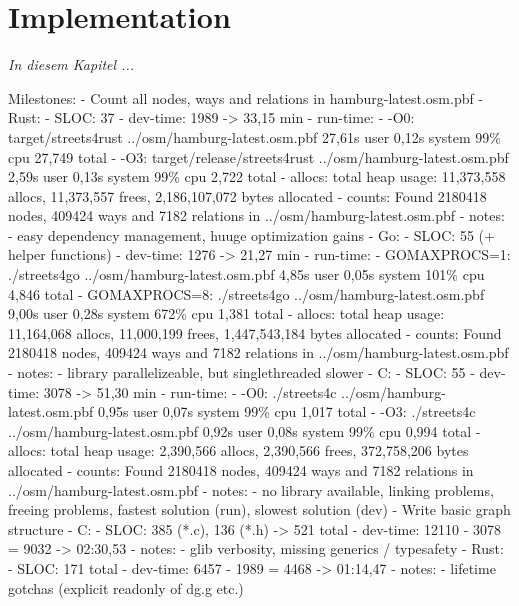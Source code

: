 \chapter{Implementation}
\label{chap:Implementation}

\textit{%
In diesem Kapitel ...
}
\bigskip


Milestones:
    - Count all nodes, ways and relations in hamburg-latest.osm.pbf
        - Rust:
            - SLOC: 37
            - dev-time: 1989 -> 33,15 min
            - run-time:
                - -O0: target/streets4rust ../osm/hamburg-latest.osm.pbf  27,61s user 0,12s system 99\% cpu 27,749 total
                - -O3: target/release/streets4rust ../osm/hamburg-latest.osm.pbf  2,59s user 0,13s system 99\% cpu 2,722 total
            - allocs: total heap usage: 11,373,558 allocs, 11,373,557 frees, 2,186,107,072 bytes allocated
            - counts: Found 2180418 nodes, 409424 ways and 7182 relations in ../osm/hamburg-latest.osm.pbf
            - notes:
                - easy dependency management, huuge optimization gains
        - Go:
            - SLOC: 55 (+ helper functions)
            - dev-time: 1276 -> 21,27 min
            - run-time:
                - GOMAXPROCS=1: ./streets4go ../osm/hamburg-latest.osm.pbf  4,85s user 0,05s system 101\% cpu 4,846 total
                - GOMAXPROCS=8: ./streets4go ../osm/hamburg-latest.osm.pbf  9,00s user 0,28s system 672\% cpu 1,381 total
            - allocs: total heap usage: 11,164,068 allocs, 11,000,199 frees, 1,447,543,184 bytes allocated
            - counts: Found 2180418 nodes, 409424 ways and 7182 relations in ../osm/hamburg-latest.osm.pbf
            - notes:
                - library parallelizeable, but singlethreaded slower
        - C:
            - SLOC: 55
            - dev-time: 3078 -> 51,30 min
            - run-time:
                - -O0: ./streets4c ../osm/hamburg-latest.osm.pbf  0,95s user 0,07s system 99\% cpu 1,017 total
                - -O3: ./streets4c ../osm/hamburg-latest.osm.pbf  0,92s user 0,08s system 99\% cpu 0,994 total
            - allocs: total heap usage: 2,390,566 allocs, 2,390,566 frees, 372,758,206 bytes allocated
            - counts: Found 2180418 nodes, 409424 ways and 7182 relations in ../osm/hamburg-latest.osm.pbf
            - notes:
                - no library available, linking problems, freeing problems, fastest solution (run), slowest solution (dev)
    - Write basic graph structure
        - C:
            - SLOC: 385 (*.c), 136 (*.h) -> 521 total
            - dev-time: 12110 - 3078 = 9032 -> 02:30,53
            - notes:
                - glib verbosity, missing generics / typesafety
        - Rust:
            - SLOC: 171 total
            - dev-time: 6457 - 1989 = 4468 -> 01:14,47
            - notes:
                - lifetime gotchas (explicit readonly of dg.g etc.)
